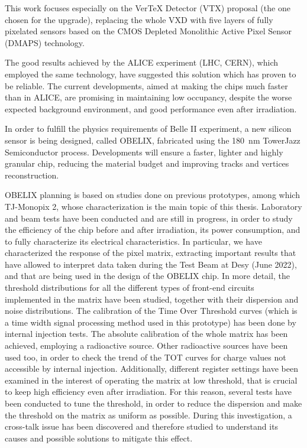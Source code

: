 This work focuses especially on the VerTeX Detector (VTX) proposal (the one chosen for the upgrade), replacing the whole VXD with five layers of fully pixelated sensors based on the CMOS Depleted Monolithic Active Pixel Sensor (DMAPS) technology.

The good results achieved by the ALICE experiment (LHC, CERN), which employed the same technology, have suggested this solution which has proven to be reliable. The current developments, aimed at making the chips much faster than in ALICE, are promising in maintaining low occupancy, despite the worse expected background environment, and good performance even after irradiation. 

In order to fulfill the physics requirements of Belle II experiment, a new silicon sensor is being designed, called OBELIX, fabricated using the \SI{180}{nm} TowerJazz Semiconductor process. Developments will ensure a faster, lighter and highly granular chip, reducing the material budget and improving tracks and vertices reconstruction. 

OBELIX planning is based on studies done on previous prototypes, among which TJ-Monopix 2, whose characterization is the main topic of this thesis. Laboratory and beam tests have been conducted and are still in progress, in order to study the efficiency of the chip before and after irradiation, its power consumption, and to fully characterize its electrical characteristics. 
In particular, we have characterized the response of the pixel matrix, extracting important results that have allowed to interpret data taken during the Test Beam at Desy (June 2022), and that are being used in the design of the OBELIX chip. 
In more detail, the threshold distributions for all the different types of front-end circuits implemented in the matrix have been studied, together with their dispersion and noise distributions. 
The calibration of the Time Over Threshold curves (which is a time width signal processing method used in this prototype) has been done by internal injection tests. The absolute calibration of the whole matrix has been achieved, employing a  radioactive source. Other radioactive sources have been used too, in order to check the trend of the TOT curves for charge values not accessible by internal injection. 
Additionally, different register settings have been examined in the interest of operating the matrix at low threshold, that is crucial to keep high efficiency even after irradiation. For this reason, several tests have been conducted to tune the threshold, in order to reduce the dispersion and make the threshold on the matrix as uniform as possible.
During this investigation, a cross-talk issue has been discovered and therefore studied to understand its causes and possible solutions to mitigate this effect.

